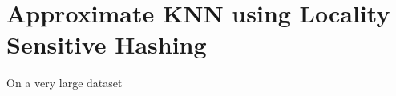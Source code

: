 \section{Approximate KNN using Locality Sensitive Hashing}
\label{sec:lsh}
On a very large dataset 
